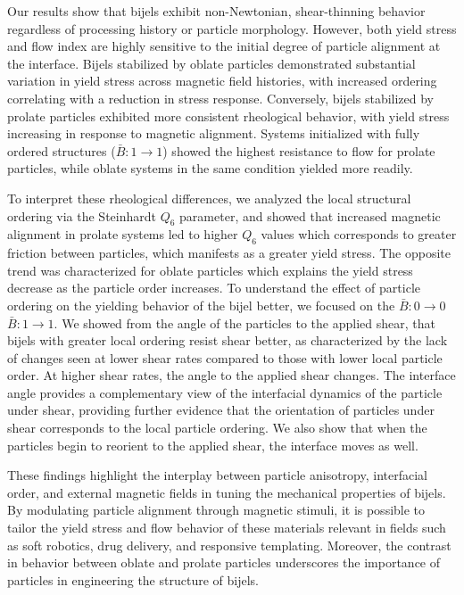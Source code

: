 Our results show that bijels exhibit non-Newtonian, shear-thinning behavior regardless of processing history or particle morphology. However, both yield stress 
and flow index are highly sensitive to the initial degree of particle alignment at the interface. Bijels stabilized by oblate particles demonstrated substantial 
variation in yield stress across magnetic field histories, with increased ordering correlating with a reduction in stress response. Conversely, bijels stabilized 
by prolate particles exhibited more consistent rheological behavior, with yield stress increasing in response to magnetic alignment. Systems initialized with 
fully ordered structures ($\bar{B}:1 \rightarrow 1$) showed the highest resistance to flow for prolate particles, while oblate systems in the same condition 
yielded more readily.

To interpret these rheological differences, we analyzed the local structural ordering via the Steinhardt $Q_6$ parameter, and showed that increased magnetic alignment in 
prolate systems led to higher $Q_6$ values which corresponds to greater friction between particles, which manifests as a greater yield stress. The opposite trend was
characterized for oblate particles which explains the yield stress decrease as the particle order increases. To understand the effect of particle ordering 
on the yielding behavior of the bijel better, we focused on the $\bar{B}:0 \rightarrow 0$ $\bar{B}:1 \rightarrow 1$. We showed from the angle of the particles to the applied
shear, that bijels with greater local ordering resist shear better, as characterized by the lack of changes seen at lower shear rates compared to those with lower local
particle order. At higher shear rates, the angle to the applied shear changes. The interface angle provides a complementary view of the interfacial dynamics of the particle 
under shear, providing further evidence that the orientation of particles under shear corresponds to the local particle ordering. We also show that when the particles begin
to reorient to the applied shear, the interface moves as well. 

These findings highlight the interplay between particle anisotropy, interfacial order, and external magnetic fields in tuning the mechanical properties of bijels. 
By modulating particle alignment through magnetic stimuli, it is possible to tailor the yield stress and flow behavior of these materials relevant in fields such as soft 
robotics, drug delivery, and responsive templating. Moreover, the contrast in behavior between oblate and prolate particles 
underscores the importance of particles in engineering the structure of bijels.